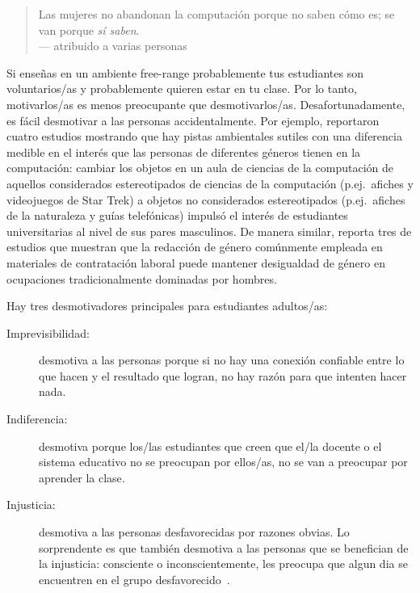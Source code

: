 
\begin{quote}

  Las mujeres no abandonan la computación porque no saben cómo es;
  se van porque \emph{sí saben}. \\
  --- atribuido a varias personas

\end{quote}

Si enseñas en un ambiente free-range
probablemente tus estudiantes son voluntarios/as
y probablemente quieren estar en tu clase.
Por lo tanto, motivarlos/as es menos preocupante que desmotivarlos/as.
Desafortunadamente,
es fácil desmotivar a las personas accidentalmente.
Por ejemplo,
\cite{Cher2009} reportaron cuatro estudios mostrando que
hay pistas ambientales sutiles con una diferencia medible en el interés que las personas de diferentes géneros tienen en la computación:
cambiar los objetos en un aula de ciencias de la computación de aquellos considerados estereotipados de ciencias de la computación
(p.ej.\ afiches y videojuegos de Star Trek)
a objetos no considerados estereotipados (p.ej.\ afiches de la naturaleza y guías telefónicas)
impulsó el interés de estudiantes universitarias al nivel de sus pares masculinos.
De manera similar,
\cite{Gauc2011} reporta tres de estudios que muestran que
la redacción de género comúnmente empleada en materiales de contratación laboral 
puede mantener desigualdad de género en ocupaciones tradicionalmente dominadas por hombres.

Hay tres desmotivadores principales para estudiantes adultos/as:

\begin{description}

\item[Imprevisibilidad:]
  desmotiva a las personas porque
  si no hay una conexión confiable entre lo que hacen y el resultado que logran,
  no hay razón para que intenten hacer nada.


\item[Indiferencia:]
  desmotiva porque
  los/las estudiantes que creen que el/la docente o el sistema educativo no se preocupan por ellos/as,
  no se van a preocupar por aprender la clase.

\item[Injusticia:]
  desmotiva a las personas desfavorecidas por razones obvias.
  Lo sorprendente es que también desmotiva a las personas que se benefician de la injusticia:
  consciente o inconscientemente,
  les preocupa que
  algun dia se encuentren en el grupo desfavorecido~\cite{Wilk2011}.

\end{description}

